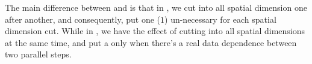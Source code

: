 {%
%
%
%	
%	
%		

The main difference between  and
 is that in , we cut into all spatial
dimension one after another, and consequently, put one ($1$)
un-necessary  for each spatial dimension cut. While in
, we have the effect of cutting into all spatial
dimensions at the same time, and put a  only when there's a
real data dependence between two parallel steps.

}
